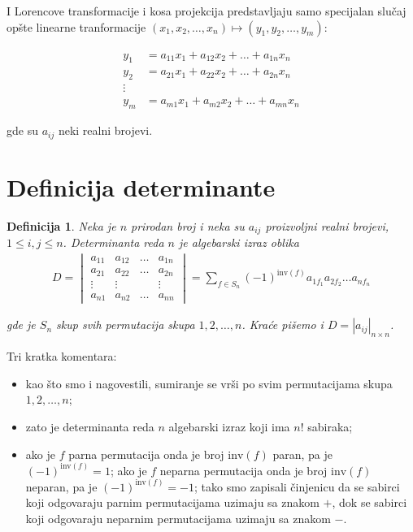\documentclass[11pt]{article}
\theoremstyle{masulthm}
\theoremstyle{masuldef}
\newtheorem{definition}{Definicija}[section]
\theoremstyle{masulexmp}
\newcommand{\inv}[1]{\text{inv}(#1)}
\begin{document}
I Lorencove transformacije i kosa projekcija predstavljaju samo specijalan slučaj opšte linearne tranformacije $ (x_1, x_2, \dots, x_n) \mapsto (y_1, y_2, \dots, y_m) $:

\begin{align*}
    y_1 & = a_{11} x_1 + a_{12} x_2 + \dots + a_{1n} x_n \\
    y_2 & = a_{21} x_1 + a_{22} x_2 + \dots + a_{2n} x_n \\
    \vdots \\
    y_m & = a_{m1} x_1 + a_{m2} x_2 + \dots + a_{mn} x_n
\end{align*}

\noindent
gde su $ a_{ij} $ neki realni brojevi.

\section{Definicija determinante}

\begin{definition}

Neka je $ n $ prirodan broj i neka su $ a_{ij} $ proizvoljni realni brojevi, $ 1 \leq i, j \leq n $.
Determinanta reda $ n $ je algebarski izraz oblika
\begin{align*}
    D =
    \begin{vmatrix}
        a_{11} & a_{12} & \dots & a_{1n} \\
        a_{21} & a_{22} & \dots & a_{2n} \\
        \vdots & \vdots &       & \vdots \\
        a_{n1} & a_{n2} & \dots & a_{nn}
    \end{vmatrix}
    = \sum_{f \in S_{n}} (-1)^{\inv{f}} a_{1f_1} a_{2f_2} \dots a_{nf_n}
\end{align*}

gde je $ S_n $ skup svih permutacija skupa $ {1, 2, \dots, n} $.
Kraće pišemo i $ D = |a_{ij}|_{n \times n} $.

\end{definition}

\noindent
Tri kratka komentara:

\begin{itemize}
    \item kao što smo i nagovestili, sumiranje se vrši po svim permutacijama skupa $ {1, 2, \dots, n} $;

    \item zato je determinanta reda $ n $ algebarski izraz koji ima $ n! $ sabiraka;

    \item ako je $ f $ parna permutacija onda je broj $ \inv{f} $ paran, pa je $ (-1)^{\inv{f}} = 1 $;
ako je $ f $ neparna permutacija onda je broj $ \inv{f} $ neparan, pa je $ (-1)^{\inv{f}} = -1 $;
tako smo zapisali činjenicu da se sabirci koji odgovaraju parnim permutacijama uzimaju sa znakom $ + $,
dok se sabirci koji odgovaraju neparnim permutacijama uzimaju sa znakom $ - $.
\end{itemize}
\end{document}
